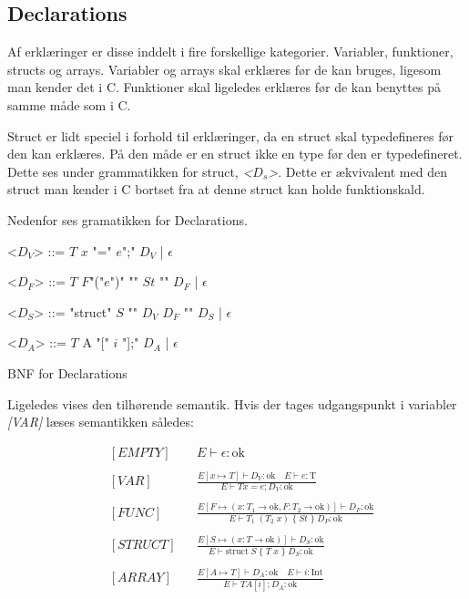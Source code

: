 \noindent \subsection{Declarations}
Af erklæringer er disse inddelt i fire forskellige kategorier. Variabler, funktioner, structs og arrays. 
Variabler og arrays skal erklæres før de kan bruges, ligesom man kender det i C. Funktioner skal ligeledes erklæres før de kan benyttes på samme måde som i C. 

Struct er lidt speciel i forhold til erklæringer, da en struct skal typedefineres før den kan erklæres. På den måde er en struct ikke en type før den er typedefineret. Dette ses under grammatikken for struct,  \textit{<$D_s$>}. Dette er ækvivalent med den struct man kender i C bortset fra at denne struct kan holde funktionskald.

Nedenfor ses gramatikken for Declarations.

\begin{Grammar}
 \begin{grammar}
 <$D_V$> ::= $T$ $x$ "=" $e$";" $D_V$ | $\epsilon$
 
 <$D_F$> ::= $T$ $F$"("$e$")" "{" $St$ "}" $D_F$ | $\epsilon$
 
 <$D_S$> ::= "struct" $S$ "{" $D_V$ $D_F$ "}" $D_S$ | $\epsilon$
 
 <$D_A$> ::= $T$ A "[" $i$ "];" $D_A$ | $\epsilon$
 \end{grammar}
 \caption{BNF for Declarations}\label{gra:declarations}
\end{Grammar}

\noindent Ligeledes vises den tilhørende semantik. Hvis der tages udgangspunkt i variabler \textit{[VAR]} læses semantikken således: 

\begin{align*}
&[EMPTY] & &E \vdash \epsilon : \text{ok}\\\\
%
&[VAR] & &\frac{E[x \mapsto T] \vdash D_V : \text{ok}\quad E \vdash e : \text{T}}{E \vdash T x = e; D_V : \text{ok}}\\\\
%
&[FUNC] & &\frac{E[F \mapsto (x : T_1 \rightarrow \text{ok}, F : T_2 \rightarrow \text{ok})] \vdash D_F : \text{ok}}{E \vdash T_1\; (T_2\; x)\; \{\; St\; \}\; D_P : \text{ok}}\\\\
%
&[STRUCT] & &\frac{E[S \mapsto (x : T \rightarrow \text{ok})] \vdash D_S : \text{ok}}{E \vdash \text{struct}\; S\; \{\;T\; x\;\}\; D_S: \text{ok}}\\\\
%
&[ARRAY] & &\frac{E[A \mapsto T] \vdash D_A : \text{ok} \quad E \vdash i : \text{Int}}{E \vdash T A [i]; D_A : \text{ok}}
\end{align*}